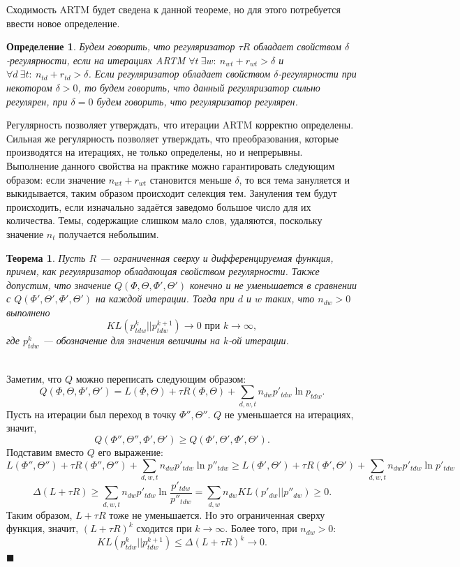 \documentclass[12pt]{article}
\newtheorem{definition}{Определение}[section]
\newtheorem{theorem}{Теорема}
\newenvironment{Proof} 
	{\par\noindent{\bf Доказательство.}} 
	{\hfill$\blacksquare$}
\renewcommand{\leq}{\leqslant}
\renewcommand{\geq}{\geqslant}
\begin{document}
	Сходимость ARTM будет сведена к данной теореме, но для этого потребуется ввести новое определение.
	\begin{definition}
	\label{strongreg}
	Будем говорить, что регуляризатор $\tau R$ обладает свойством $\delta$-регулярности, если на итерациях ARTM $\forall t~\exists w \colon~n_{wt} + r_{wt} > \delta$ и $\forall d~\exists t \colon~n_{td} + r_{td} > \delta$. Если регуляризатор  обладает свойством $\delta$-регулярности при некотором $\delta > 0$, то будем говорить, что данный регуляризатор сильно регулярен, при $\delta=0$ будем говорить, что регуляризатор регулярен.
	\end{definition}

 Регулярность позволяет утверждать, что итерации ARTM корректно определены. Сильная же регулярность позволяет утверждать, что преобразования, которые производятся на итерациях, не только определены, но и непрерывны. Выполнение данного свойства на практике  можно гарантировать следующим образом: если значение $n_{wt} + r_{wt}$ становится меньше $\delta$, то вся тема зануляется  и выкидывается, таким образом происходит селекция тем. Зануления тем будут происходить, если  изначально задаётся заведомо большое число для их количества. Темы, содержащие слишком мало слов, удаляются, поскольку значение $n_t$ получается небольшим.
	\begin{theorem} \label{theorem_neighbour_zero1} Пусть $R$ --- ограниченная сверху и дифференцируемая функция, причем, как регуляризатор обладающая свойством регулярности. Также допустим,  что значение $Q(\Phi, \Theta, \Phi', \Theta')$ конечно и не уменьшается в сравнении с $Q(\Phi', \Theta', \Phi', \Theta')$ на каждой итерации. Тогда при $d$ и $w$ таких, что $n_{dw} > 0$ выполнено
\[
KL(p_{tdw}^{k}||p_{tdw}^{k + 1}) \to 0 \text{ при } k \to \infty,
\]
где $p_{tdw}^{k}$ --- обозначение для значения величины на $k$-ой итерации.
	\end{theorem}
	\begin{Proof}\ \\
Заметим, что $Q$ можно переписать следующим образом:
\[
Q(\Phi, \Theta, \Phi', \Theta') = L(\Phi, \Theta) + \tau R(\Phi, \Theta) + \sum\limits_{d, w, t} n_{dw} p'_{tdw} \ln{p_{tdw}}.
\]
Пусть на итерации был переход в точку $\Phi'', \Theta''$. $Q$ не уменьшается на итерациях, значит,
\[
	Q(\Phi'', \Theta'', \Phi', \Theta') \geq Q(\Phi', \Theta', \Phi', \Theta').
\]
Подставим вместо $Q$ его выражение:
\[
	L(\Phi'', \Theta'') + \tau R(\Phi'', \Theta'') + \sum\limits_{d, w, t} n_{dw} p'_{tdw} \ln{p''_{tdw}}  \geq L(\Phi', \Theta') + \tau R(\Phi', \Theta') + \sum\limits_{d, w, t} n_{dw} p'_{tdw} \ln{p'_{tdw}}
\]
\[
	\Delta(L + \tau R) \geq  \sum\limits_{d, w, t} n_{dw} p'_{tdw} \ln{\frac{p'_{tdw}}{p''_{tdw}}} = \sum\limits_{d, w} n_{dw} KL(p'_{dw} || p''_{dw}) \geq 0.
\]
Таким образом, $L + \tau R$  тоже не уменьшается. Но это ограниченная сверху функция, значит, $(L + \tau R)^{k}$ сходится при $k \to \infty$. Более того, при $n_{dw} > 0$:
\[
	KL(p_{tdw}^{k}||p_{tdw}^{k+1}) \leq \Delta (L + \tau R)^{k} \to 0.
\]
\end{Proof}\ \\
\end{document}
